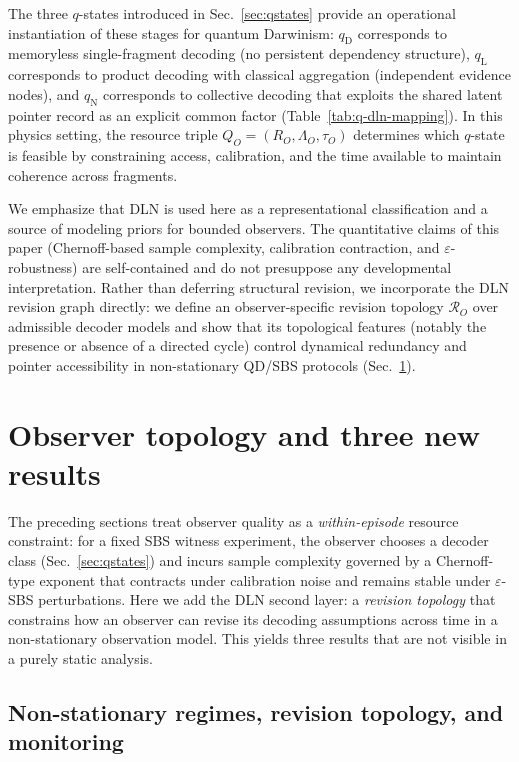 \documentclass[11pt]{article}
\newcommand{\cR}{\mathcal{R}}
\newcommand{\1}{\mathbf{1}}
\theoremstyle{definition}
\theoremstyle{plain}
\begin{document}
The three $q$-states introduced in Sec.~\ref{sec:qstates} provide an operational instantiation of these stages for quantum Darwinism:
$q_{\mathrm{D}}$ corresponds to memoryless single-fragment decoding (no persistent dependency structure),
$q_{\mathrm{L}}$ corresponds to product decoding with classical aggregation (independent evidence nodes),
and $q_{\mathrm{N}}$ corresponds to collective decoding that exploits the shared latent pointer record as an explicit common factor (Table~\ref{tab:q-dln-mapping}).
In this physics setting, the resource triple $Q_O=(R_O,\Lambda_O,\tau_O)$ determines which $q$-state is feasible by constraining access, calibration, and the time available to maintain coherence across fragments.

We emphasize that DLN is used here as a representational classification and a source of modeling priors for bounded observers.
The quantitative claims of this paper (Chernoff-based sample complexity, calibration contraction, and $\varepsilon$-robustness) are self-contained and do not presuppose any developmental interpretation.
Rather than deferring structural revision, we incorporate the DLN revision graph directly: we define an observer-specific revision topology $\cR_O$ over admissible decoder models and show that its topological features (notably the presence or absence of a directed cycle) control dynamical redundancy and pointer accessibility in non-stationary QD/SBS protocols (Sec.~\ref{sec:observer-topology}).


\section{Observer topology and three new results}
\label{sec:observer-topology}

The preceding sections treat observer quality as a \emph{within-episode} resource constraint: for a fixed SBS witness experiment, the observer chooses a decoder class (Sec.~\ref{sec:qstates}) and incurs sample complexity governed by a Chernoff-type exponent that contracts under calibration noise and remains stable under $\varepsilon$-SBS perturbations.
Here we add the DLN second layer: a \emph{revision topology} that constrains how an observer can revise its decoding assumptions across time in a non-stationary observation model.
This yields three results that are not visible in a purely static analysis.

\subsection{Non-stationary regimes, revision topology, and monitoring}
\end{document}
